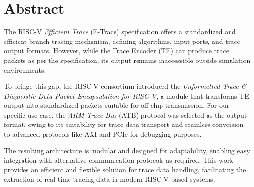 \chapter*{Abstract}\label{abstract}

The RISC-V \textit{Efficient Trace} (E-Trace) specification offers a standardized and efficient 
branch tracing mechanism, defining algorithms, input ports, and trace output formats. However, 
while the Trace Encoder (TE) can produce trace packets as per the specification, its output 
remains inaccessible outside simulation environments.  

To bridge this gap, the RISC-V consortium introduced the \textit{Unformatted Trace \& Diagnostic 
Data Packet Encapsulation for RISC-V}, a module that transforms TE output into standardized 
packets suitable for off-chip transmission.
For our specific use case, the \textit{ARM Trace Bus} (ATB) protocol was selected as the output 
format, owing to its suitability for trace data transport and seamless conversion to advanced 
protocols like AXI and PCIe for debugging purposes.  

The resulting architecture is modular and designed for adaptability, enabling easy integration 
with alternative communication protocols as required. This work provides an efficient and 
flexible solution for trace data handling, facilitating the extraction of real-time tracing data 
in modern RISC-V-based systems.